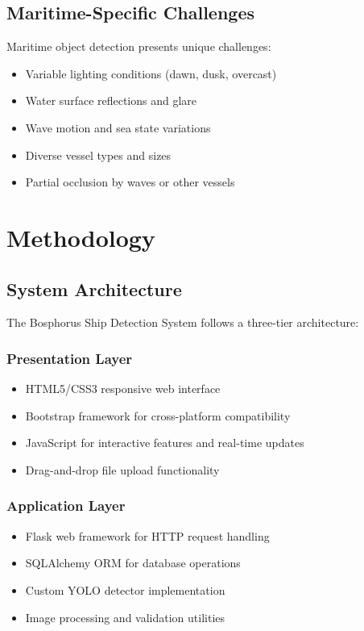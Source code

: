 \documentclass[12pt,a4paper]{report}
\begin{document}
\section{Maritime-Specific Challenges}
Maritime object detection presents unique challenges:
\begin{itemize}
    \item Variable lighting conditions (dawn, dusk, overcast)
    \item Water surface reflections and glare
    \item Wave motion and sea state variations
    \item Diverse vessel types and sizes
    \item Partial occlusion by waves or other vessels
\end{itemize}

\chapter{Methodology}

\section{System Architecture}
The Bosphorus Ship Detection System follows a three-tier architecture:

\subsection{Presentation Layer}
\begin{itemize}
    \item HTML5/CSS3 responsive web interface
    \item Bootstrap framework for cross-platform compatibility
    \item JavaScript for interactive features and real-time updates
    \item Drag-and-drop file upload functionality
\end{itemize}

\subsection{Application Layer}
\begin{itemize}
    \item Flask web framework for HTTP request handling
    \item SQLAlchemy ORM for database operations
    \item Custom YOLO detector implementation
    \item Image processing and validation utilities
\end{itemize}
\end{document}

